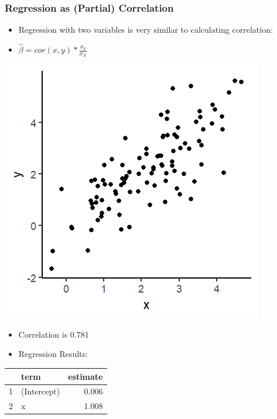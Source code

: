 \documentclass[xcolor=x11names,compress]{beamer}\usepackage[]{graphicx}\usepackage[]{color}
\makeatletter
\def\maxwidth{ %
  \ifdim\Gin@nat@width>\linewidth
    \linewidth
  \else
    \Gin@nat@width
  \fi
}
\newenvironment{knitrout}{}{} %
\renewcommand{\(}{\begin{columns}}
\renewcommand{\)}{\end{columns}}
\newcommand{\<}[1]{\begin{column}{#1}}
\renewcommand{\>}{\end{column}}
\makeatother
\begin{document}
\begin{frame}
\frametitle{Regression as (Partial) Correlation}
\begin{itemize}
\item Regression with two variables is very similar to calculating correlation:
\item $\hat{\beta}=cor(x,y) * \frac{\sigma_Y}{\sigma_X}$
\end{itemize}
\begin{multicols}{2}
\begin{knitrout}
\color{fgcolor}
\includegraphics[width=\maxwidth]{figure/corr_regn_fig2-1} 

\end{knitrout}
\columnbreak
\begin{itemize}
\item Correlation is 0.781
\pause
\item Regression Results:
\end{itemize}
\begin{table}[ht]
\centering
\begin{tabular}{rlr}
  \hline
 & term & estimate \\ 
  \hline
1 & (Intercept) & 0.006 \\ 
  2 & x & 1.008 \\ 
   \hline
\end{tabular}
\end{table}

\end{multicols}
\end{frame}
\end{document}
